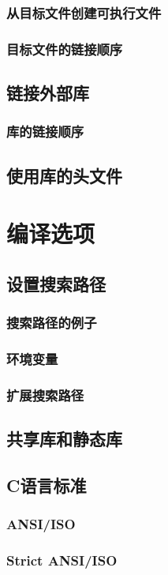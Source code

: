 \documentclass[lang=cn,10pt,newtx,scheme=chinese]{elegantbook}
\begin{document}
\subsection{从目标文件创建可执行文件}
\subsection{目标文件的链接顺序}
\section{链接外部库}
\subsection{库的链接顺序}
\section{使用库的头文件}

\chapter{编译选项}
\section{设置搜索路径}
\subsection{搜索路径的例子}
\subsection{环境变量}
\subsection{扩展搜索路径}
\section{共享库和静态库}
\section{C语言标准}
\subsection{ANSI/ISO}
\subsection{Strict ANSI/ISO}
\end{document}
